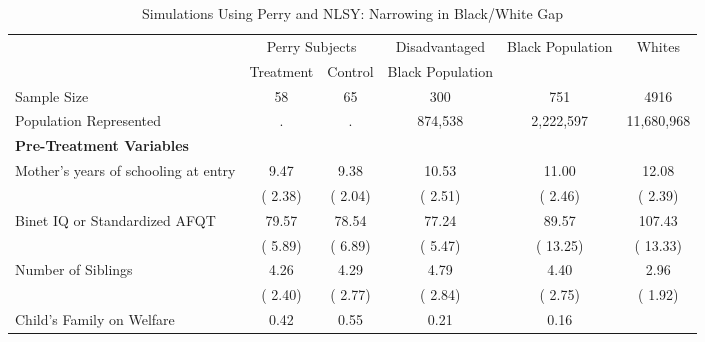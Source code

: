\begin{table}[htbp]
\caption{\label{tab:_table} Simulations Using Perry and NLSY: Narrowing in Black/White Gap}\centering\medskip
\footnotesize  \begin{center} \begin{tabular}{lccccccc}  \hline \hline    
 & \multicolumn{2}{c}{Perry Subjects}  & \multicolumn{2}{c}{Disadvantaged}  & \multicolumn{2}{c}{Black Population}  & \multicolumn{1}{c}{Whites} \\  & \multicolumn{1}{c}{Treatment}  & \multicolumn{1}{c}{Control}  & \multicolumn{2}{c}{Black Population}  & \multicolumn{1}{c}{ } \\   \hline   
Sample Size &58&           65& \multicolumn{2}{c}{          300} & \multicolumn{2}{c}{          751} &
\multicolumn{1}{c}{         4916} 
 \\[0.2cm] 
Population Represented &.&            .& \multicolumn{2}{c}{      874,538} & \multicolumn{2}{c}{    2,222,597} &
\multicolumn{1}{c}{   11,680,968} 
 \\[0.2cm] \hline
\textbf{Pre-Treatment Variables}  \\[0.2cm] 
Mother's years of schooling at entry &         9.47 &         9.38 & \multicolumn{2}{c}{        10.53} &
\multicolumn{2}{c}{        11.00} &
\multicolumn{1}{c}{        12.08} 
 \\[0.2cm]  
 & (        2.38) & (        2.04) & \multicolumn{2}{c}{(        2.51)} &
\multicolumn{2}{c}{(        2.46)} &
\multicolumn{1}{c}{(        2.39)} 
 \\[0.2cm]  
Binet IQ or Standardized AFQT &        79.57 &        78.54 & \multicolumn{2}{c}{        77.24} &
\multicolumn{2}{c}{        89.57} &
\multicolumn{1}{c}{       107.43} 
 \\[0.2cm]  
 & (        5.89) & (        6.89) & \multicolumn{2}{c}{(        5.47)} &
\multicolumn{2}{c}{(       13.25)} &
\multicolumn{1}{c}{(       13.33)} 
 \\[0.2cm]  
Number of Siblings &         4.26 &         4.29 & \multicolumn{2}{c}{         4.79} &
\multicolumn{2}{c}{         4.40} &
\multicolumn{1}{c}{         2.96} 
 \\[0.2cm]  
 & (        2.40) & (        2.77) & \multicolumn{2}{c}{(        2.84)} &
\multicolumn{2}{c}{(        2.75)} &
\multicolumn{1}{c}{(        1.92)} 
 \\[0.2cm]  
Child's Family on Welfare &         0.42 &         0.55 & \multicolumn{2}{c}{         0.21} &
\multicolumn{2}{c}{         0.16} &

\end{tabular}
\end{center}
\end{table}
